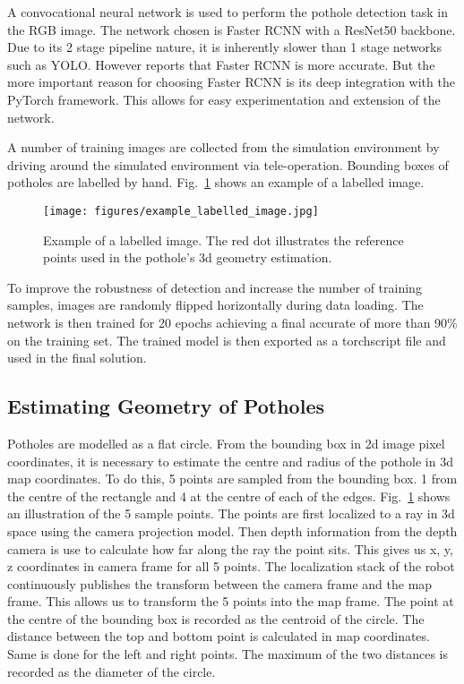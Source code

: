 \documentclass[conference]{IEEEtran}
\begin{document}
A convocational neural network is used to perform the pothole detection task in the RGB image. The network chosen is Faster RCNN\cite{renFasterRCNNRealTime2016} with a ResNet50\cite{heDeepResidualLearning2015} backbone. Due to its 2 stage pipeline nature, it is inherently slower than 1 stage networks such as YOLO\cite{redmonYOLOv3IncrementalImprovement2018}. However \cite{redmonYOLOv3IncrementalImprovement2018} reports that Faster RCNN is more accurate. But the more important reason for choosing Faster RCNN is its deep integration with the PyTorch framework. This allows for easy experimentation and extension of the network.

A number of training images are collected from the simulation environment by driving around the simulated environment via tele-operation. Bounding boxes of potholes are labelled by hand. Fig.~\ref{fig:example_labelled_image} shows an example of a labelled image.

\begin{figure}
    \centering
    \texttt{[image: figures/example\_labelled\_image.jpg]}
    \caption{Example of a labelled image. The red dot illustrates the reference points used in the pothole's 3d geometry estimation.}
    \label{fig:example_labelled_image}
\end{figure}

To improve the robustness of detection and increase the number of training samples, images are randomly flipped horizontally during data loading. The network is then trained for 20 epochs achieving a final accurate of more than 90\% on the training set. The trained model is then exported as a torchscript file and used in the final solution.

\subsection{Estimating Geometry of Potholes}\label{sec:estimate_geometry}

Potholes are modelled as a flat circle. From the bounding box in 2d image pixel coordinates, it is necessary to estimate the centre and radius of the pothole in 3d map coordinates.
To do this, 5 points are sampled from the bounding box. 1 from the centre of the rectangle and 4 at the centre of each of the edges. Fig.~\ref{fig:example_labelled_image} shows an illustration of the 5 sample points. The points are first localized to a ray in 3d space using the camera projection model. Then depth information from the depth camera is use to calculate how far along the ray the point sits. This gives us x, y, z coordinates in camera frame for all 5 points. The localization stack of the robot continuously publishes the transform between the camera frame and the map frame. This allows us to transform the 5 points into the map frame. The point at the centre of the bounding box is recorded as the centroid of the circle. The distance between the top and bottom point is calculated in map coordinates. Same is done for the left and right points. The maximum of the two distances is recorded as the diameter of the circle.
\end{document}

